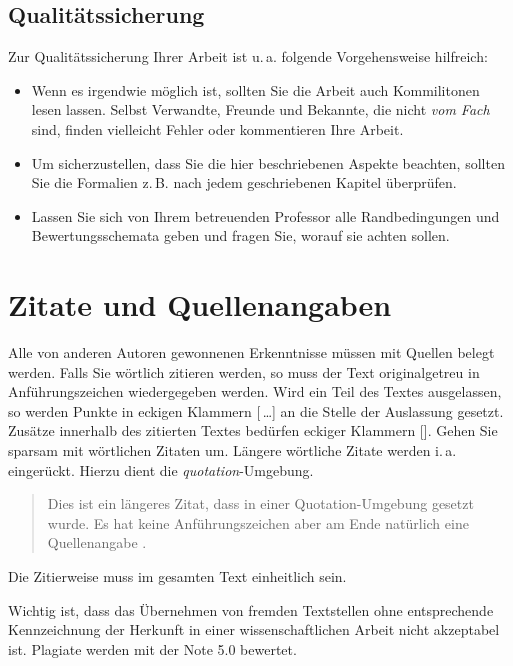 \documentclass[conference,compsoc,final,a4paper]{IEEEtran}
\begin{document}
\subsection{Qualitätssicherung}
Zur Qualitätssicherung Ihrer Arbeit ist u.\,a. folgende Vorgehensweise hilfreich:
\begin{itemize}
\item Wenn es irgendwie möglich ist, sollten Sie die Arbeit auch Kommilitonen lesen lassen. Selbst Verwandte, Freunde und Bekannte, die nicht \emph{vom Fach} sind, finden vielleicht Fehler oder kommentieren Ihre Arbeit.
\item Um sicherzustellen, dass Sie die hier beschriebenen Aspekte beachten, sollten Sie die Formalien z.\,B. nach jedem geschriebenen Kapitel überprüfen.
\item Lassen Sie sich von Ihrem betreuenden Professor alle Randbedingungen und Bewertungsschemata geben und fragen Sie, worauf sie achten sollen.
\end{itemize}



\section{Zitate und Quellenangaben}\label{quellen}
Alle von anderen Autoren gewonnenen Erkenntnisse müssen mit Quellen belegt werden. Falls Sie wörtlich zitieren werden, so muss der Text originalgetreu in Anführungszeichen wiedergegeben werden. Wird ein Teil des Textes ausgelassen, so werden Punkte in eckigen Klammern [\,\dots] an die Stelle der Auslassung gesetzt. Zusätze innerhalb des zitierten Textes bedürfen eckiger Klammern []. Gehen Sie sparsam mit wörtlichen Zitaten um. Längere wörtliche Zitate werden i.\,a. eingerückt. Hierzu dient die \textit{quotation}-Umgebung.

\begin{quotation}
Dies ist ein längeres Zitat, dass in einer Quotation-Umgebung gesetzt wurde. Es hat keine Anführungszeichen aber am Ende natürlich eine Quellenangabe \cite{Kornmeier2011}.
\end{quotation}

Die Zitierweise muss im gesamten Text einheitlich sein.

Wichtig ist, dass das Übernehmen von fremden Textstellen ohne entsprechende Kennzeichnung der Herkunft in einer wissenschaftlichen Arbeit nicht akzeptabel ist. Plagiate werden mit der Note 5.0 bewertet.
\end{document}
